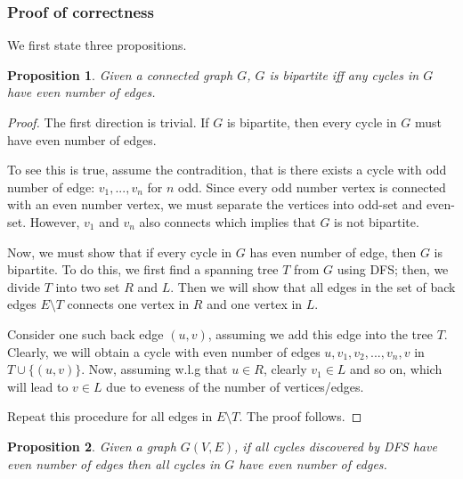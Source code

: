 \documentclass[a4paper,10pt,twoside]{article}
\newtheorem{proof}{Proof}
\newtheorem{proposition}{Proposition}
\begin{document}
\subsubsection*{Proof of correctness}
We first state three propositions.
\begin{proposition}
	Given a connected graph $G$, $G$ is bipartite iff any cycles in $G$ have even number of
	edges.
\end{proposition}
\begin{proof}
	The first direction is trivial. If $G$ is bipartite, then every cycle in $G$
	must have even number of edges. 

	To see this is true, assume the contradition,
	that is there exists a cycle with odd number of edge: $v_1,...,v_n$ for $n$ odd. 
	Since every odd number vertex is connected with an even number vertex, we must
	separate the vertices into odd-set and even-set. However, $v_1$ and $v_n$ also connects
	which implies that $G$ is not bipartite.

	Now, we must show that if every cycle in $G$ has even number of edge, then $G$ is
	bipartite. 
	To do this, we first find a spanning tree $T$ from $G$ using DFS; then, we divide $T$
	into two set $R$ and $L$. Then we will show that all edges in the set of back edges
	$E\setminus T$ connects one vertex in $R$ and one vertex in $L$.

	Consider one such back edge $(u, v)$, assuming we add this edge into the tree $T$.
	Clearly, we will obtain a cycle with even number
	of edges $u, v_1, v_2, ..., v_n, v$ in $T \cup \{(u, v)\}$. Now, assuming w.l.g that
	$u\in R$, clearly $v_1 \in L$ and so on, which will lead to $v \in L$ due to eveness
	of the number of vertices/edges.

	Repeat this procedure for all edges in $E\setminus T$. The proof follows.



\end{proof}
\begin{proposition} 
	Given a graph $G(V, E)$, if all cycles discovered by DFS
	have even number of edges then all cycles in $G$ have even number of edges.
\end{proposition}
\end{document}
